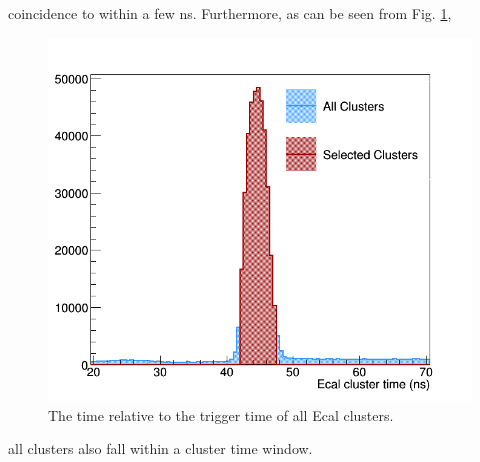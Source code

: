 coincidence to within a few ns. Furthermore, as can be seen from Fig. 
\ref{fig:cluster_times}, 
\begin{figure}[t]
    \centering
    \includegraphics[width=.9\textwidth]{images/20160428_ecal_cluster_time.png}
    \caption{The time relative to the trigger time of all Ecal clusters.}
    \label{fig:cluster_times}
\end{figure}  
all clusters also fall within a cluster time window. 

